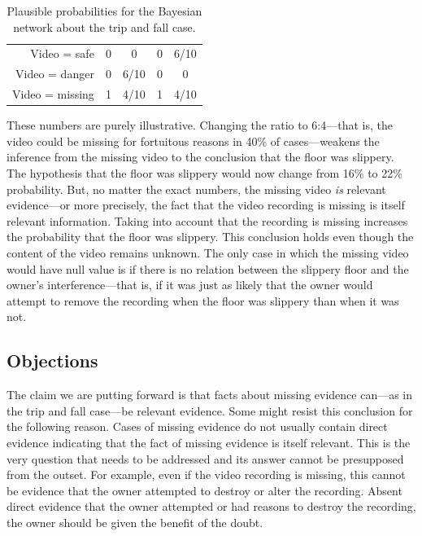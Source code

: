 \documentclass[
  10pt,
  dvipsnames,enabledeprecatedfontcommands]{scrartcl}
\begin{document}
\begin{table}
\begin{tabular}{r | cc cc}
Video = safe         &  0               &       0         &           0         &        6/10      \\ 
Video = danger       &  0               &       6/10      &           0         &        0         \\ 
Video = missing      &  1               &       4/10      &           1         &        4/10       \\ 
\end{tabular}
\caption{Plausible probabilities for the Bayesian network about the trip and fall case.}
\label{table:prob-missing-video}
\end{table}

These numbers are purely illustrative. Changing the ratio to 6:4---that
is, the video could be missing for fortuitous reasons in 40\% of
cases---weakens the inference from the missing video to the conclusion
that the floor was slippery. The hypothesis that the floor was slippery
would now change from 16\% to 22\% probability. But, no matter the exact
numbers, the missing video \textit{is} relevant evidence---or more
precisely, the fact that the video recording is missing is itself
relevant information. Taking into account that the recording is missing
increases the probability that the floor was slippery. This conclusion
holds even though the content of the video remains unknown. The only
case in which the missing video would have null value is if there is no
relation between the slippery floor and the owner's interference---that
is, if it was just as likely that the owner would attempt to remove the
recording when the floor was slippery than when it was not.

\hypertarget{objections}{%
\subsection{Objections}\label{objections}}

The claim we are putting forward is that facts about missing evidence
can---as in the trip and fall case---be relevant evidence. Some might
resist this conclusion for the following reason. Cases of missing
evidence do not usually contain direct evidence indicating that the fact
of missing evidence is itself relevant. This is the very question that
needs to be addressed and its answer cannot be presupposed from the
outset. For example, even if the video recording is missing, this cannot
be evidence that the owner attempted to destroy or alter the recording.
Absent direct evidence that the owner attempted or had reasons to
destroy the recording, the owner should be given the benefit of the
doubt.
\end{document}
